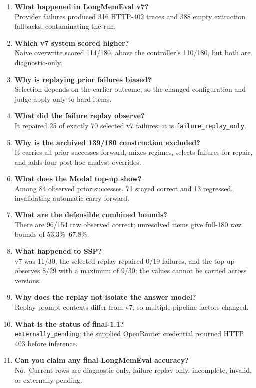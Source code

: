 \begin{enumerate}
\def\labelenumi{\arabic{enumi}.}
\setcounter{enumi}{41}
\item
  \textbf{What happened in LongMemEval v7?}\\
  Provider failures produced 316 HTTP-402 traces and 388 empty
  extraction fallbacks, contaminating the run.
\item
  \textbf{Which v7 system scored higher?}\\
  Naive overwrite scored 114/180, above the controller's 110/180, but
  both are diagnostic-only.
\item
  \textbf{Why is replaying prior failures biased?}\\
  Selection depends on the earlier outcome, so the changed configuration
  and judge apply only to hard items.
\item
  \textbf{What did the failure replay observe?}\\
  It repaired 25 of exactly 70 selected v7 failures; it is
  \texttt{failure\_replay\_only}.
\item
  \textbf{Why is the archived 139/180 construction excluded?}\\
  It carries all prior successes forward, mixes regimes, selects
  failures for repair, and adds four post-hoc analyst overrides.
\item
  \textbf{What does the Modal top-up show?}\\
  Among 84 observed prior successes, 71 stayed correct and 13 regressed,
  invalidating automatic carry-forward.
\item
  \textbf{What are the defensible combined bounds?}\\
  There are 96/154 raw observed correct; unresolved items give full-180
  raw bounds of 53.3\%--67.8\%.
\item
  \textbf{What happened to SSP?}\\
  v7 was 11/30, the selected replay repaired 0/19 failures, and the
  top-up observes 8/29 with a maximum of 9/30; the values cannot be
  carried across versions.
\item
  \textbf{Why does the replay not isolate the answer model?}\\
  Replay prompt contexts differ from v7, so multiple pipeline factors
  changed.
\item
  \textbf{What is the status of final-1.1?}\\
  \texttt{externally\_pending}; the supplied OpenRouter credential
  returned HTTP 403 before inference.
\item
  \textbf{Can you claim any final LongMemEval accuracy?}\\
  No.~Current rows are diagnostic-only, failure-replay-only, incomplete,
  invalid, or externally pending.
\end{enumerate}

